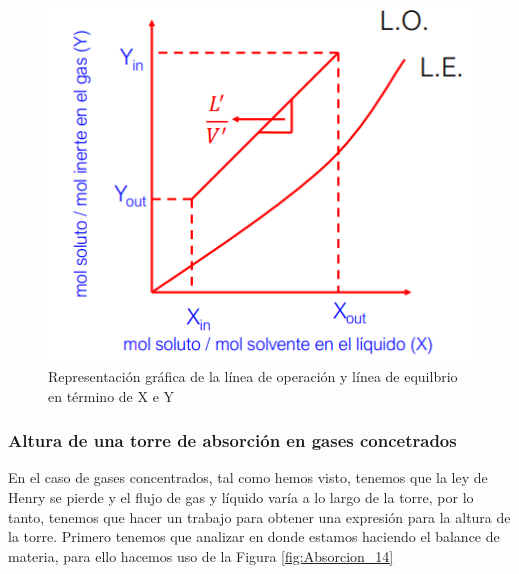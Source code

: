 \documentclass[11pt]{book}
\begin{document}
\begin{figure}
    \centering
    \includegraphics{img/absorcion/Absorcion_13.PNG}
    \caption{Representación gráfica de la línea de operación y línea de equilbrio en término de X e Y}
    \label{fig:Absorcion_13}
\end{figure}

\subsubsection{Altura de una torre de absorción en gases concetrados}

En el caso de gases concentrados, tal como hemos visto, tenemos que la ley de Henry se pierde y el flujo de gas y líquido varía a lo largo de la torre, por lo tanto, tenemos que hacer un trabajo para obtener una expresión para la altura de la torre. Primero tenemos que analizar en donde estamos haciendo el balance de materia, para ello hacemos uso de la Figura \ref{fig:Absorcion_14}
\end{document}
